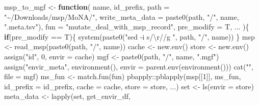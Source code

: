 \documentclass[
]{article}
\newenvironment{Shaded}{\begin{snugshade}}{\end{snugshade}}
\newcommand{\AttributeTok}[1]{\textcolor[rgb]{0.77,0.63,0.00}{#1}}
\newcommand{\ControlFlowTok}[1]{\textcolor[rgb]{0.13,0.29,0.53}{\textbf{#1}}}
\newcommand{\DecValTok}[1]{\textcolor[rgb]{0.00,0.00,0.81}{#1}}
\newcommand{\FunctionTok}[1]{\textcolor[rgb]{0.00,0.00,0.00}{#1}}
\newcommand{\NormalTok}[1]{#1}
\newcommand{\OtherTok}[1]{\textcolor[rgb]{0.56,0.35,0.01}{#1}}
\newcommand{\SpecialCharTok}[1]{\textcolor[rgb]{0.00,0.00,0.00}{#1}}
\newcommand{\StringTok}[1]{\textcolor[rgb]{0.31,0.60,0.02}{#1}}
\begin{document}
\begin{Shaded}
\begin{Highlighting}[]
\NormalTok{msp\_to\_mgf }\OtherTok{\textless{}{-}}
  \ControlFlowTok{function}\NormalTok{(}
\NormalTok{           name,}
\NormalTok{           id\_prefix,}
           \AttributeTok{path =} \StringTok{"\textasciitilde{}/Downloads/msp/MoNA/"}\NormalTok{,}
           \AttributeTok{write\_meta\_data =} \FunctionTok{paste0}\NormalTok{(path, }\StringTok{"/"}\NormalTok{, name, }\StringTok{".meta.tsv"}\NormalTok{),}
           \AttributeTok{fun =} \StringTok{"mutate\_deal\_with\_msp\_record"}\NormalTok{,}
           \AttributeTok{pre\_modify =}\NormalTok{ T,}
\NormalTok{           ...}
\NormalTok{           )\{}
    \ControlFlowTok{if}\NormalTok{(pre\_modify }\SpecialCharTok{==}\NormalTok{ T)\{}
      \FunctionTok{system}\NormalTok{(}\FunctionTok{paste0}\NormalTok{(}\StringTok{"sed {-}i \textquotesingle{}s/}\SpecialCharTok{\textbackslash{}r}\StringTok{//g\textquotesingle{} "}\NormalTok{, path, }\StringTok{"/"}\NormalTok{, name))}
\NormalTok{    \}}
\NormalTok{    msp }\OtherTok{\textless{}{-}} \FunctionTok{read\_msp}\NormalTok{(}\FunctionTok{paste0}\NormalTok{(path, }\StringTok{"/"}\NormalTok{, name))}
\NormalTok{    cache }\OtherTok{\textless{}{-}} \FunctionTok{new.env}\NormalTok{()}
\NormalTok{    store }\OtherTok{\textless{}{-}} \FunctionTok{new.env}\NormalTok{()}
    \FunctionTok{assign}\NormalTok{(}\StringTok{"id"}\NormalTok{, }\DecValTok{0}\NormalTok{, }\AttributeTok{envir =}\NormalTok{ cache)}
\NormalTok{    mgf }\OtherTok{\textless{}{-}} \FunctionTok{paste0}\NormalTok{(path, }\StringTok{"/"}\NormalTok{, name, }\StringTok{".mgf"}\NormalTok{)}
    \FunctionTok{assign}\NormalTok{(}\StringTok{"envir\_meta"}\NormalTok{, }\FunctionTok{environment}\NormalTok{(), }\AttributeTok{envir =} \FunctionTok{parent.env}\NormalTok{(}\FunctionTok{environment}\NormalTok{()))}
    \FunctionTok{cat}\NormalTok{(}\StringTok{""}\NormalTok{, }\AttributeTok{file =}\NormalTok{ mgf)}
\NormalTok{    ms\_fun }\OtherTok{\textless{}{-}} \FunctionTok{match.fun}\NormalTok{(fun)}
\NormalTok{    pbapply}\SpecialCharTok{::}\FunctionTok{pblapply}\NormalTok{(msp[[}\DecValTok{1}\NormalTok{]], ms\_fun, }
                      \AttributeTok{id\_prefix =}\NormalTok{ id\_prefix,}
                      \AttributeTok{cache =}\NormalTok{ cache,}
                      \AttributeTok{store =}\NormalTok{ store,}
\NormalTok{                      ...)}
\NormalTok{    set }\OtherTok{\textless{}{-}} \FunctionTok{ls}\NormalTok{(}\AttributeTok{envir =}\NormalTok{ store)}
\NormalTok{    meta\_data }\OtherTok{\textless{}{-}} \FunctionTok{lapply}\NormalTok{(set, get\_envir\_df,}

\end{Highlighting}
\end{Shaded}
\end{document}
